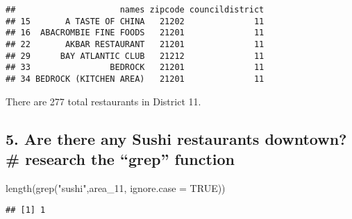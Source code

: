 \documentclass[
]{article}
\newenvironment{Shaded}{\begin{snugshade}}{\end{snugshade}}
\newcommand{\AttributeTok}[1]{\textcolor[rgb]{0.77,0.63,0.00}{#1}}
\newcommand{\ConstantTok}[1]{\textcolor[rgb]{0.00,0.00,0.00}{#1}}
\newcommand{\FunctionTok}[1]{\textcolor[rgb]{0.00,0.00,0.00}{#1}}
\newcommand{\NormalTok}[1]{#1}
\newcommand{\OtherTok}[1]{\textcolor[rgb]{0.56,0.35,0.01}{#1}}
\newcommand{\SpecialCharTok}[1]{\textcolor[rgb]{0.00,0.00,0.00}{#1}}
\newcommand{\StringTok}[1]{\textcolor[rgb]{0.31,0.60,0.02}{#1}}
\begin{document}
\begin{Shaded}
\end{Shaded}

\begin{verbatim}
##                     names zipcode councildistrict
## 15       A TASTE OF CHINA   21202              11
## 16  ABACROMBIE FINE FOODS   21201              11
## 22       AKBAR RESTAURANT   21201              11
## 29      BAY ATLANTIC CLUB   21212              11
## 33                BEDROCK   21201              11
## 34 BEDROCK (KITCHEN AREA)   21201              11
\end{verbatim}

There are 277 total restaurants in District 11.

\hypertarget{are-there-any-sushi-restaurants-downtown-research-the-grep-function}{%
\subsection{5. Are there any Sushi restaurants downtown? \# research the
``grep''
function}\label{are-there-any-sushi-restaurants-downtown-research-the-grep-function}}

\begin{Shaded}
\begin{Highlighting}[]
\FunctionTok{length}\NormalTok{(}\FunctionTok{grep}\NormalTok{(}\StringTok{"sushi"}\NormalTok{,area\_11, }\AttributeTok{ignore.case =} \ConstantTok{TRUE}\NormalTok{))}
\end{Highlighting}
\end{Shaded}

\begin{verbatim}
## [1] 1
\end{verbatim}
\end{document}

